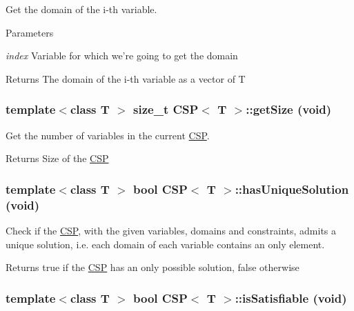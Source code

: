 Get the domain of the i-\/th variable. 


\begin{DoxyParams}{Parameters}
\item[{\em index}]Variable for which we're going to get the domain \end{DoxyParams}
\begin{DoxyReturn}{Returns}
The domain of the i-\/th variable as a vector of T 
\end{DoxyReturn}
\hypertarget{classCSP_a91a0e89bc1882d39b88122bee392c5f3}{
\subsubsection[{getSize}]{\setlength{\rightskip}{0pt plus 5cm}template$<$class T $>$ size\_\-t {\bf CSP}$<$ T $>$::getSize (void)}}
\label{classCSP_a91a0e89bc1882d39b88122bee392c5f3}


Get the number of variables in the current \hyperlink{classCSP}{CSP}. 

\begin{DoxyReturn}{Returns}
Size of the \hyperlink{classCSP}{CSP} 
\end{DoxyReturn}
\hypertarget{classCSP_ae96286c6c7dfb6fe077544e0d4af15f4}{
\subsubsection[{hasUniqueSolution}]{\setlength{\rightskip}{0pt plus 5cm}template$<$class T $>$ bool {\bf CSP}$<$ T $>$::hasUniqueSolution (void)}}
\label{classCSP_ae96286c6c7dfb6fe077544e0d4af15f4}


Check if the \hyperlink{classCSP}{CSP}, with the given variables, domains and constraints, admits a unique solution, i.e. each domain of each variable contains an only element. 

\begin{DoxyReturn}{Returns}
true if the \hyperlink{classCSP}{CSP} has an only possible solution, false otherwise 
\end{DoxyReturn}
\hypertarget{classCSP_a7ef9eb91c38815c9d82182696a6bd5d3}{
\subsubsection[{isSatisfiable}]{\setlength{\rightskip}{0pt plus 5cm}template$<$class T $>$ bool {\bf CSP}$<$ T $>$::isSatisfiable (void)}}
\label{classCSP_a7ef9eb91c38815c9d82182696a6bd5d3}


